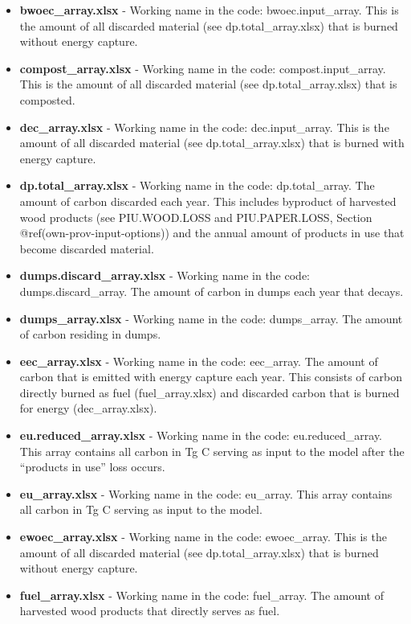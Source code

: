 \documentclass[
  openany]{book}
\begin{document}
\begin{itemize}
\item
  \textbf{bwoec\_array.xlsx} - Working name in the code:
  bwoec.input\_array. This is the amount of all discarded material (see
  dp.total\_array.xlsx) that is burned without energy capture.
\item
  \textbf{compost\_array.xlsx} - Working name in the code:
  compost.input\_array. This is the amount of all discarded material
  (see dp.total\_array.xlsx) that is composted.
\item
  \textbf{dec\_array.xlsx} - Working name in the code: dec.input\_array.
  This is the amount of all discarded material (see
  dp.total\_array.xlsx) that is burned with energy capture.
\item
  \textbf{dp.total\_array.xlsx} - Working name in the code:
  dp.total\_array. The amount of carbon discarded each year. This
  includes byproduct of harvested wood products (see PIU.WOOD.LOSS and
  PIU.PAPER.LOSS, Section @ref(own-prov-input-options)) and the annual
  amount of products in use that become discarded material.
\item
  \textbf{dumps.discard\_array.xlsx} - Working name in the code:
  dumps.discard\_array. The amount of carbon in dumps each year that
  decays.
\item
  \textbf{dumps\_array.xlsx} - Working name in the code: dumps\_array.
  The amount of carbon residing in dumps.
\item
  \textbf{eec\_array.xlsx} - Working name in the code: eec\_array. The
  amount of carbon that is emitted with energy capture each year. This
  consists of carbon directly burned as fuel (fuel\_array.xlsx) and
  discarded carbon that is burned for energy (dec\_array.xlsx).
\item
  \textbf{eu.reduced\_array.xlsx} - Working name in the code:
  eu.reduced\_array. This array contains all carbon in Tg C serving as
  input to the model after the ``products in use'' loss occurs.
\item
  \textbf{eu\_array.xlsx} - Working name in the code: eu\_array. This
  array contains all carbon in Tg C serving as input to the model.
\item
  \textbf{ewoec\_array.xlsx} - Working name in the code: ewoec\_array.
  This is the amount of all discarded material (see
  dp.total\_array.xlsx) that is burned without energy capture.
\item
  \textbf{fuel\_array.xlsx} - Working name in the code: fuel\_array. The
  amount of harvested wood products that directly serves as fuel.

\end{itemize}
\end{document}
